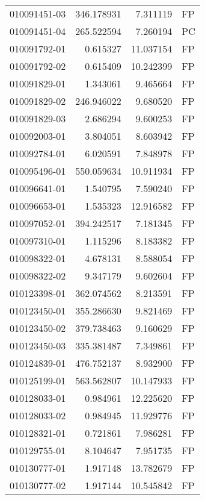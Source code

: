\begin{tabular}{lrrl}
010091451-03 &  346.178931 &       7.311119 &   FP \\
010091451-04 &  265.522594 &       7.260194 &   PC \\
010091792-01 &    0.615327 &      11.037154 &   FP \\
010091792-02 &    0.615409 &      10.242399 &   FP \\
010091829-01 &    1.343061 &       9.465664 &   FP \\
010091829-02 &  246.946022 &       9.680520 &   FP \\
010091829-03 &    2.686294 &       9.600253 &   FP \\
010092003-01 &    3.804051 &       8.603942 &   FP \\
010092784-01 &    6.020591 &       7.848978 &   FP \\
010095496-01 &  550.059634 &      10.911934 &   FP \\
010096641-01 &    1.540795 &       7.590240 &   FP \\
010096653-01 &    1.535323 &      12.916582 &   FP \\
010097052-01 &  394.242517 &       7.181345 &   FP \\
010097310-01 &    1.115296 &       8.183382 &   FP \\
010098322-01 &    4.678131 &       8.588054 &   FP \\
010098322-02 &    9.347179 &       9.602604 &   FP \\
010123398-01 &  362.074562 &       8.213591 &   FP \\
010123450-01 &  355.286630 &       9.821469 &   FP \\
010123450-02 &  379.738463 &       9.160629 &   FP \\
010123450-03 &  335.381487 &       7.349861 &   FP \\
010124839-01 &  476.752137 &       8.932900 &   FP \\
010125199-01 &  563.562807 &      10.147933 &   FP \\
010128033-01 &    0.984961 &      12.225620 &   FP \\
010128033-02 &    0.984945 &      11.929776 &   FP \\
010128321-01 &    0.721861 &       7.986281 &   FP \\
010129755-01 &    8.104647 &       7.951735 &   FP \\
010130777-01 &    1.917148 &      13.782679 &   FP \\
010130777-02 &    1.917144 &      10.545842 &   FP \\

\end{tabular}
